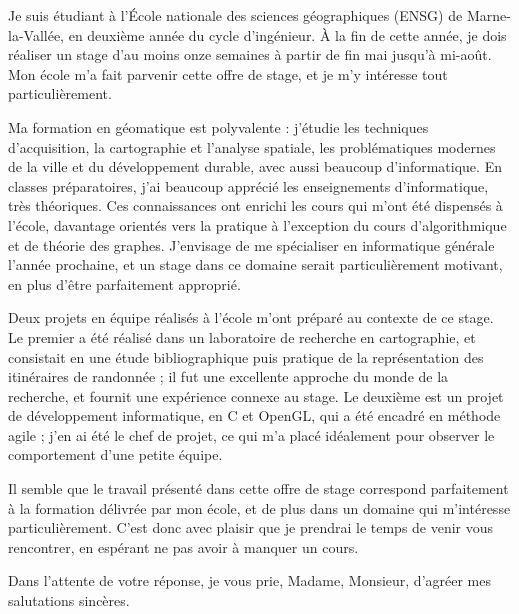 Je suis étudiant à l'École nationale des sciences géographiques (ENSG) de Marne-la-Vallée, en deuxième année du cycle d'ingénieur. À la fin de cette année, je dois réaliser un stage d'au moins onze semaines à partir de fin mai jusqu'à mi-août. Mon école m'a fait parvenir cette offre de stage, et je m'y intéresse tout particulièrement.

Ma formation en géomatique est polyvalente : j'étudie les techniques d'acquisition, la cartographie et l'analyse spatiale, les problématiques modernes de la ville et du développement durable, avec aussi beaucoup d'informatique. En classes préparatoires, j'ai beaucoup apprécié les enseignements d'informatique, très théoriques. Ces connaissances ont enrichi les cours qui m'ont été dispensés à l'école, davantage orientés vers la pratique à l'exception du cours d'algorithmique et de théorie des graphes. J'envisage de me spécialiser en informatique générale l'année prochaine, et un stage dans ce domaine serait particulièrement motivant, en plus d'être parfaitement approprié.

Deux projets en équipe réalisés à l'école m'ont préparé au contexte de ce stage. Le premier a été réalisé dans un laboratoire de recherche en cartographie, et consistait en une étude bibliographique puis pratique de la représentation des itinéraires de randonnée ; il fut une excellente approche du monde de la recherche, et fournit une expérience connexe au stage. Le deuxième est un projet de développement informatique, en C\raisebox{1.5pt}{\small $++$} et OpenGL, qui a été encadré en méthode agile ; j'en ai été le chef de projet, ce qui m'a placé idéalement pour observer le comportement d'une petite équipe.

Il semble que le travail présenté dans cette offre de stage correspond parfaitement à la formation délivrée par mon école, et de plus dans un domaine qui m'intéresse particulièrement. C'est donc avec plaisir que je prendrai le temps de venir vous rencontrer, en espérant ne pas avoir à manquer un cours.

Dans l'attente de votre réponse, je vous prie, Madame, Monsieur, d'agréer mes salutations sincères.


